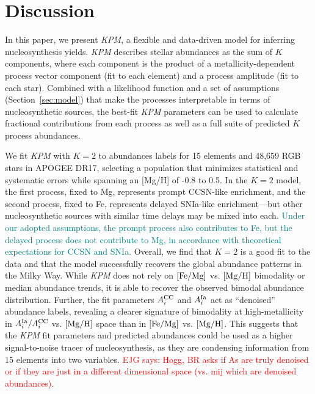 \documentclass[modern]{aastex631}
\newcommand{\femg}{[{\rm Fe}/{\rm Mg}]}
\newcommand{\mgh}{[{\rm Mg}/{\rm H}]}
\newcommand{\Acc}{A^{\rm CC}_{i}}
\newcommand{\AIa}{A^{\rm Ia}_{i}}
\newcommand{\ejg}[1]{\textcolor{red}{EJG says: #1}}
\newcommand{\add}[1]{\textcolor{teal}{#1}}
\newcommand{\name}{\textsl{KPM}}
\begin{document}
\section{Discussion}\label{sec:discussion}

In this paper, we present \name{}, a flexible and data-driven model for inferring nucleosynthesis yields. \name{} describes stellar abundances as the sum of $K$ components, where each component is the product of a metallicity-dependent process vector component (fit to each element) and a process amplitude (fit to each star).    Combined with a likelihood function and a set of assumptions (Section~\ref{sec:model}) that make the processes interpretable in terms of nucleosynthetic sources, the best-fit \name{} parameters can be used to calculate fractional contributions from each process as well as a full suite of predicted $K$ process abundances. 

We fit \name{} with $K=2$ to abundances labels for 15 elements and 48,659 RGB stars in APOGEE DR17, selecting a population that minimizes statistical and systematic errors while spanning an [Mg/H] of -0.8 to 0.5. In the $K=2$ model, the first process, fixed to Mg, represents prompt CCSN-like enrichment, and the second process, fixed to Fe, represents delayed SNIa-like enrichment---but other nucleosynthetic sources with similar time delays may be mixed into each. \add{Under our adopted assumptions, the prompt process also contributes to Fe, but the delayed process does not contribute to Mg, in accordance with theoretical expectations for CCSN and SNIa.} Overall, we find that $K=2$ is a good fit to the data and that the model successfully recovers the global abundance patterns in the Milky Way. While \name{} does not rely on $\femg$ vs. $\mgh$ bimodality or median abundance trends, it is able to recover the observed bimodal abundance distribution. Further, the fit parameters $\Acc$ and $\AIa$ act as ``denoised'' abundance labels, revealing a clearer signature of bimodality at high-metallicity in $\AIa/\Acc$ vs. $\mgh$ space than in $\femg$ vs. $\mgh$. This suggests that the \name{} fit parameters and predicted abundances could be used as a higher signal-to-noise tracer of nucleosynthesis, as they are condensing information from 15 elements into two variables. \ejg{Hogg, BR asks if As are truly denoised or if they are just in a different dimensional space (vs. mij which are denoised abundances).}
\end{document}
